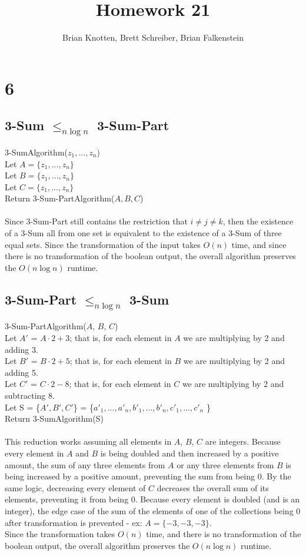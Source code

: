 \documentclass[letterpaper,notitlepage,twoside]{article}
\newcommand\tab[1][1cm]{\hspace*{#1}} %
\begin{document}
\title{Homework 21}
\author{Brian Knotten, Brett Schreiber, Brian Falkenstein}
\maketitle
\section*{6}

\subsection*{3-Sum $\leq_{n \log n}$ 3-Sum-Part}
3-SumAlgorithm($z_1,...,z_n$)\\
\tab Let $A = \{z_1,...,z_n\}$\\
\tab Let $B = \{z_1,...,z_n\}$\\
\tab Let $C = \{z_1,...,z_n\}$\\
\tab Return 3-Sum-PartAlgorithm($A, B, C$)
\\\\
Since 3-Sum-Part still contains the restriction that $i \neq j \neq k$, then the existence of a 3-Sum all from one set is equivalent to the existence of a 3-Sum of three equal sets. Since the transformation of the input takes $O(n)$ time, and since there is no transformation of the boolean output, the overall algorithm preserves the $O(n \log n)$ runtime.

\subsection*{3-Sum-Part $\leq_{n \log n}$ 3-Sum}
3-Sum-PartAlgorithm($A$, $B$, $C$)\\
\tab Let $A'$ = $A \cdot 2 + 3$; that is, for each element in $A$ we are multiplying by 2 and adding 3.\\
\tab Let $B'$ = $B \cdot 2 + 5$; that is, for each element in $B$ we are multiplying by 2 and adding 5.\\
\tab Let $C'$ = $C \cdot 2 - 8$; that is, for each element in $C$ we are multiplying by 2 and subtracting 8.\\
\tab Let S = \{$A', B', C'$\} = \{$a'_1,...,a'_n, b'_1,...,b'_n, c'_1,...,c'_n$ \}\\
\tab Return 3-SumAlgorithm(S)\\\\
This reduction works assuming all elements in $A$, $B$, $C$ are integers. Because every element in $A$ and $B$ is being doubled and then increased by a positive amount, the sum of any three elements from $A$ or any three elements from $B$ is being increased by a positive amount, preventing the sum from being 0. By the same logic, decreasing every element of $C$ decreases the overall sum of its elements, preventing it from being 0. Because every element is doubled (and is an integer), the edge case of the sum of the elements of one of the collections being 0 after transformation is prevented - ex: $A = \{ -3, -3, -3\}$. \\
Since the transformation takes $O(n)$ time, and there is no transformation of the boolean output, the overall algorithm preserves the $O(n \log n)$ runtime.
\end{document}
